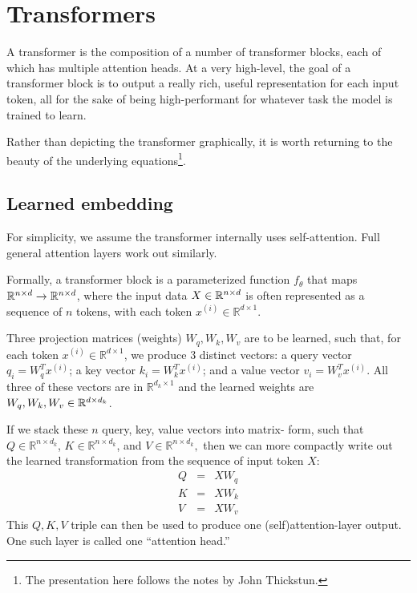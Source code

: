 
\section{Transformers}
\label{sec-transformers}
A transformer is the composition of a number of transformer blocks, each of which has multiple attention heads. At a very high-level, the goal of a transformer block is to output a really rich, useful representation for each input token, all for the sake of being high-performant for whatever task the model is trained to learn.

Rather than depicting the transformer graphically, it is worth returning to the beauty of the underlying equations\footnote{The presentation here follows the notes by John Thickstun.}.





%
%
%

%
\subsection{Learned embedding}\label{sec-learnedembedding}
For simplicity, we assume the transformer internally uses self-attention. Full general attention layers work out similarly.

Formally, a transformer block is a parameterized function $f_\theta$ that maps $\mathbb{R}^{n\times d}\rightarrow \mathbb{R}^{n\times d}$, where the input data $X \in \mathbb{R}^{n\times d}$ is often represented as a sequence of $n$ tokens, with each token $x^{(i)}\in \mathbb{R}^{d\times 1}.$


Three projection matrices (weights) $W_{q}, W_k, W_v$ are to be learned, such that, for each token $x^{(i)}\in \mathbb{R}^{d\times 1}$, we produce 3 distinct vectors: a query vector $q_i = W_q^T x^{(i)}$; a key vector $k_i = W_k^T x^{(i)}$; and a value vector $v_i = W_v^T x^{(i)}$.  All three of these vectors are in $\mathbb{R}^{d_k\times 1}$ and the learned weights are $W_{q}, W_{k}, W_{v} \in \mathbb{R}^{d\times d_k}$.

If we stack these $n$ query, key, value vectors into matrix- form, such that $Q\in \mathbb{R}^{n\times d_k}$, $K\in \mathbb{R}^{n\times d_k}$, and $V\in \mathbb{R}^{n\times d_k},$ then we can more compactly write out the learned transformation from the sequence of input token $X$:
\begin{eqnarray*}
  Q &=& X W_{q}
  \\
  K &=& X W_{k}
  \\
  V &=& X W_{v}
\end{eqnarray*}
This $Q, K, V$ triple can then be used to produce one (self)attention-layer output. One such layer is called one ``attention head.''


